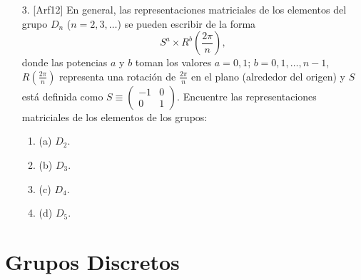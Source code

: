 \documentclass[a4paper,12pt]{article}
\begin{document}
\newpage

\begin{enumerate}
    \item [3.] [Arf12] En general, las representaciones matriciales de los elementos del grupo $D_n$ ($n = 2, 3, \ldots$) se pueden escribir de la forma
    $$
    S^a \times R^b\left(\frac{2\pi}{n}\right),
    $$
    donde las potencias $a$ y $b$ toman los valores $a = 0, 1$; $b = 0, 1, \ldots, n-1$, $R\left(\frac{2\pi}{n}\right)$ representa una rotación de $\frac{2\pi}{n}$ en el plano (alrededor del origen) y $S$ está definida como $S \equiv \begin{pmatrix} -1 & 0 \\ 0 & 1 \end{pmatrix}$. Encuentre las representaciones matriciales de los elementos de los grupos:
    \begin{enumerate}
        \item (a) $D_2$.
        \item (b) $D_3$.
        \item (c) $D_4$.
        \item (d) $D_5$.
    \end{enumerate}
\end{enumerate}

\section*{Grupos Discretos}
\end{document}

